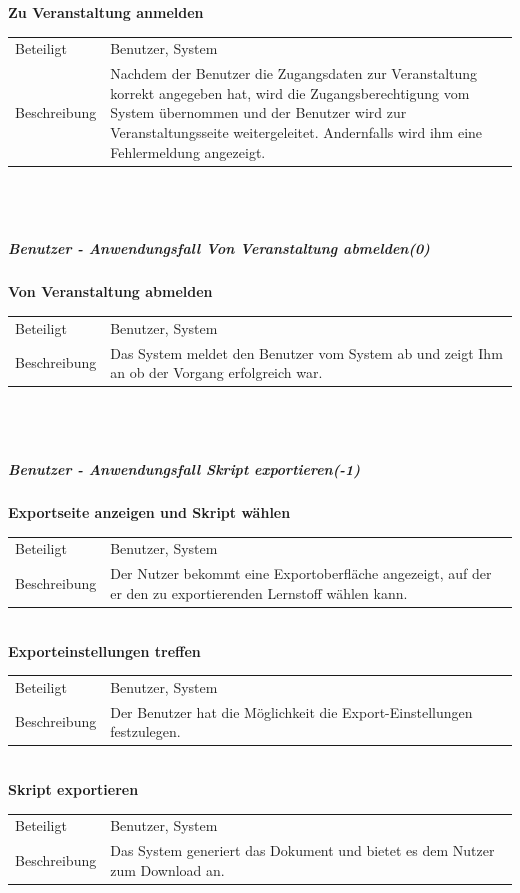 \documentclass[12pt,a4paper]{article}
\begin{document}
\textbf{Zu Veranstaltung anmelden}\\
\begin{tabular}{l|p{12cm}}
\hline 
Beteiligt & Benutzer, System \\ 
Beschreibung & Nachdem der Benutzer die Zugangsdaten zur Veranstaltung korrekt angegeben hat, wird die Zugangsberechtigung vom System übernommen und der Benutzer wird zur Veranstaltungsseite weitergeleitet. Andernfalls wird ihm eine Fehlermeldung angezeigt.\\ 
\end{tabular}\\\\


\subparagraph{Benutzer - Anwendungsfall \glqq Von Veranstaltung abmelden\grqq (0)}\mbox{}

\textbf{Von Veranstaltung abmelden}\\
\begin{tabular}{l|p{12cm}}
\hline 
Beteiligt & Benutzer, System \\ 
Beschreibung & Das System meldet den Benutzer vom System ab und zeigt Ihm an ob der Vorgang erfolgreich war. \\ 
\end{tabular}\\\\


\subparagraph{Benutzer - Anwendungsfall \glqq Skript exportieren\grqq (-1)}\mbox{}

\textbf{Exportseite anzeigen und Skript wählen}\\
\begin{tabular}{l|p{12cm}}
\hline 
Beteiligt & Benutzer, System \\ 
Beschreibung & Der Nutzer bekommt eine Exportoberfläche angezeigt, auf der er den zu exportierenden Lernstoff wählen kann. \\ 
\end{tabular}\\

\textbf{Exporteinstellungen treffen}\\
\begin{tabular}{l|p{12cm}}
\hline 
Beteiligt & Benutzer, System \\ 
Beschreibung & Der Benutzer hat die Möglichkeit die Export-Einstellungen festzulegen. \\ 
\end{tabular}\\

\textbf{Skript exportieren}\\
\begin{tabular}{l|p{12cm}}
\hline 
Beteiligt & Benutzer, System \\ 
Beschreibung & Das System generiert das Dokument und bietet es dem Nutzer zum Download an. \\ 
\end{tabular}\\\\
\end{document}
